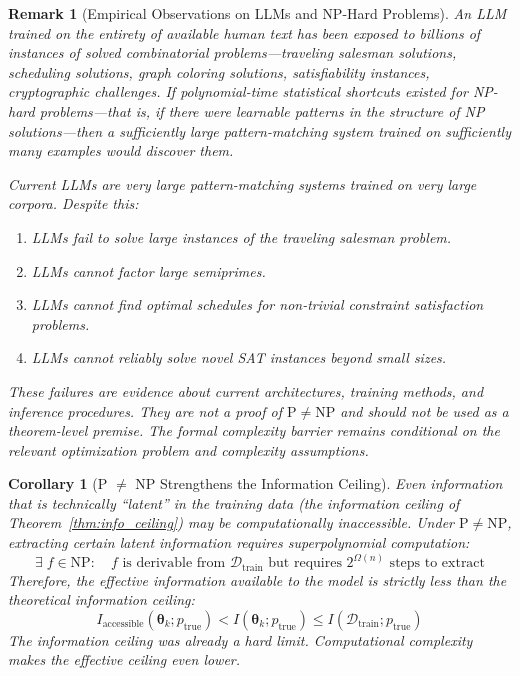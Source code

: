 \documentclass[11pt,a4paper]{article}
\newtheorem{corollary}[theorem]{Corollary}
\newtheorem{remark}[theorem]{Remark}
\begin{document}
\begin{remark}[Empirical Observations on LLMs and NP-Hard Problems]
\label{rem:pnp_empirical}
An LLM trained on the entirety of available human text has been exposed to billions of instances of solved combinatorial problems---traveling salesman solutions, scheduling solutions, graph coloring solutions, satisfiability instances, cryptographic challenges. If polynomial-time statistical shortcuts existed for NP-hard problems---that is, if there were learnable patterns in the structure of NP solutions---then a sufficiently large pattern-matching system trained on sufficiently many examples would discover them.

Current LLMs are very large pattern-matching systems trained on very large corpora. Despite this:
\begin{enumerate}
    \item LLMs fail to solve large instances of the traveling salesman problem.
    \item LLMs cannot factor large semiprimes.
    \item LLMs cannot find optimal schedules for non-trivial constraint satisfaction problems.
    \item LLMs cannot reliably solve novel SAT instances beyond small sizes.
\end{enumerate}
These failures are evidence about current architectures, training methods, and inference procedures. They are not a proof of $\mathrm{P} \neq \mathrm{NP}$ and should not be used as a theorem-level premise. The formal complexity barrier remains conditional on the relevant optimization problem and complexity assumptions.
\end{remark}

\begin{corollary}[P $\neq$ NP Strengthens the Information Ceiling]
\label{cor:pnp_info}
Even information that is technically ``latent'' in the training data (the information ceiling of Theorem~\ref{thm:info_ceiling}) may be computationally inaccessible. Under $\mathrm{P} \neq \mathrm{NP}$, extracting certain latent information requires superpolynomial computation:
\begin{equation}
\exists\; f \in \mathrm{NP}: \quad f \text{ is derivable from } \mathcal{D}_{\mathrm{train}} \text{ but requires } 2^{\Omega(n)} \text{ steps to extract}
\end{equation}
Therefore, the effective information available to the model is strictly less than the theoretical information ceiling:
\begin{equation}
I_{\mathrm{accessible}}(\bm{\theta}_k; p_{\mathrm{true}}) < I(\bm{\theta}_k; p_{\mathrm{true}}) \leq I(\mathcal{D}_{\mathrm{train}}; p_{\mathrm{true}})
\end{equation}
The information ceiling was already a hard limit. Computational complexity makes the \emph{effective} ceiling even lower.
\end{corollary}
\end{document}
